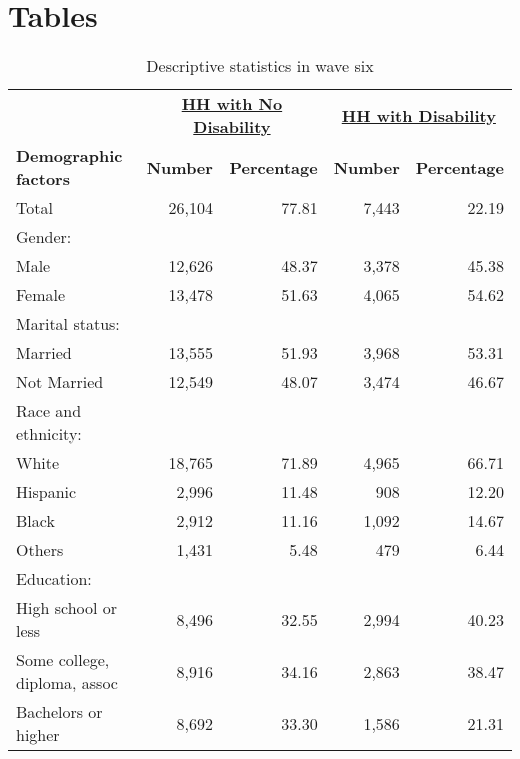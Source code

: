
\section{Tables}

\noindent
\begin{table}[H] 
\centering 
\footnotesize
\caption{Descriptive statistics in wave six} 
\begin{tabular}{lrrrr}
\hline 
\hline 
& \multicolumn{2}{c}{\underline{\bf{HH with No Disability}}} & \multicolumn{2}{c}{\underline{\bf{HH with Disability}}} \\
{\bf{Demographic factors}} & {\bf{Number}} & {\bf{Percentage}} & {\bf{Number}} & {\bf{Percentage}} \\
\hline 
Total					& 26,104	& 77.81		& 7,443		& 22.19		\\
Gender:					&		&		&		& 		\\
\hspace{5pt} Male			& 12,626	& 48.37		& 3,378		& 45.38		\\
\hspace{5pt} Female			& 13,478	& 51.63		& 4,065		& 54.62		\\
Marital status:				&		&		&		& 		\\
\hspace{5pt} Married			& 13,555	& 51.93		& 3,968		& 53.31		\\
\hspace{5pt} Not Married		& 12,549	& 48.07		& 3,474		& 46.67		\\
Race and ethnicity:			&		&		&		& 		\\
\hspace{5pt} White			& 18,765 	& 71.89		& 4,965		& 66.71		\\
\hspace{5pt} Hispanic			&  2,996	& 11.48		&   908		& 12.20		\\
\hspace{5pt} Black			&  2,912	& 11.16		& 1,092		& 14.67		\\
\hspace{5pt} Others			&  1,431	&  5.48		&   479		&  6.44		\\
Education:				&		&		&		& 		\\
\hspace{5pt} High school or less	&  8,496 	& 32.55		& 2,994		& 40.23		\\
\hspace{5pt} Some college, diploma, assoc& 8,916 	& 34.16		& 2,863		& 38.47		\\
\hspace{5pt} Bachelors or higher	&  8,692 	& 33.30		& 1,586		& 21.31		\\
\hline 
\hline 
\end{tabular}
\label{tab:DescStats}
\end{table}


